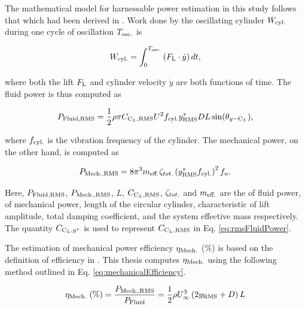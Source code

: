 \documentclass[oneside]{utmthesis}
\begin{document}
The mathematical model for harnessable power estimation in this study follows that which had been derived in \citet{Raghavan2007a}. Work done by the oscillating cylinder $W_{\text{cyl.}}$ during one cycle of oscillation $T_{\text{osc.}}$ is

\begin{equation}
  W_{\text{cyl.}} = \int_{0}^{T_{\text{osc.}}} \left ( F_{\text{L}} \cdot \dot{y} \right ) dt,
  \label{eq:workCylinder}
\end{equation}

\noindent where both the lift $F_{\text{L}}$ and cylinder velocity $\dot{y}$ are both functions of time. The fluid power is thus computed as

\begin{equation}
  P_{\text{Fluid,RMS}} = \frac{1}{2} \rho \pi C_{\text{C}_{L},\text{RMS}} U^{2} f_{\text{cyl.}} y^{*}_{\text{RMS}} D L \sin(\theta_{y-\text{C}_{L}}),
  \label{eq:rmsFluidPower}
\end{equation}

\noindent where $f_{\text{cyl.}}$ is the vibration frequency of the cylinder. The mechanical power, on the other hand, is computed as

\begin{equation}
  P_{\text{Mech.,RMS}} = 8 \pi^{3} m_{\text{eff.}} \zeta_{tot.} \left (y^{*}_{\text{RMS}} f_{\text{cyl.}} \right )^{2} f_{n}.
  \label{eq:rmsMechPower}
\end{equation}

Here, $P_{\text{Fluid,RMS}}$, $P_{\text{Mech.,RMS}}$, $L$, $C_{\text{C}_{L},\text{RMS}}$, $\zeta_{tot.}$ and $m_{\text{eff.}}$ are the \rms{} of fluid power, \rms{} of mechanical power, length of the circular cylinder, characteristic \rms{} of lift amplitude, total damping coefficient, and the system effective mass respectively. The quantity $C_{\text{C}_{L},y^{*}}$ is used to represent $C_{\text{C}_{L},\text{RMS}}$ in Eq. \ref{eq:rmsFluidPower}.

The estimation of mechanical power efficiency $\eta_{\text{Mech.}}$ (\%) is based on the definition of efficiency in \citet{Sun2018}. This thesis computes $\eta_{\text{Mech.}}$ using the following method outlined in Eq. \ref{eq:mechanicalEfficiency}.

\begin{equation}
  \eta_{\text{Mech.}} \;(\%) = \frac{P_{\text{Mech.,RMS}}}{P_{\text{Fluid}}} = \frac{1}{2}\rho U^{3}_{\infty} \left( 2 y_{\text{RMS}} + D \right) L
  \label{eq:mechanicalEfficiency}
\end{equation}
\end{document}
